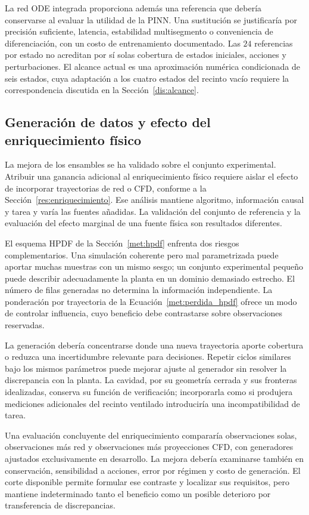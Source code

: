La red ODE integrada proporciona además una referencia que debería conservarse al evaluar la utilidad de la PINN. Una sustitución se justificaría por precisión suficiente, latencia, estabilidad multisegmento o conveniencia de diferenciación, con un costo de entrenamiento documentado. Las $24$ referencias por estado no acreditan por sí solas cobertura de estados iniciales, acciones y perturbaciones. El alcance actual es una aproximación numérica condicionada de seis estados, cuya adaptación a los cuatro estados del recinto vacío requiere la correspondencia discutida en la Sección~\ref{dis:alcance}.

\subsection{Generación de datos y efecto del enriquecimiento físico}

La mejora de los ensambles se ha validado sobre el conjunto experimental. Atribuir una ganancia adicional al enriquecimiento físico requiere aislar el efecto de incorporar trayectorias de red o CFD, conforme a la Sección~\ref{res:enriquecimiento}. Ese análisis mantiene algoritmo, información causal y tarea y varía las fuentes añadidas. La validación del conjunto de referencia y la evaluación del efecto marginal de una fuente física son resultados diferentes.

El esquema HPDF de la Sección~\ref{met:hpdf} enfrenta dos riesgos complementarios. Una simulación coherente pero mal parametrizada puede aportar muchas muestras con un mismo sesgo; un conjunto experimental pequeño puede describir adecuadamente la planta en un dominio demasiado estrecho. El número de filas generadas no determina la información independiente. La ponderación por trayectoria de la Ecuación~\eqref{met:perdida_hpdf} ofrece un modo de controlar influencia, cuyo beneficio debe contrastarse sobre observaciones reservadas.

La generación debería concentrarse donde una nueva trayectoria aporte cobertura o reduzca una incertidumbre relevante para decisiones. Repetir ciclos similares bajo los mismos parámetros puede mejorar ajuste al generador sin resolver la discrepancia con la planta. La cavidad, por su geometría cerrada y sus fronteras idealizadas, conserva su función de verificación; incorporarla como si produjera mediciones adicionales del recinto ventilado introduciría una incompatibilidad de tarea.

Una evaluación concluyente del enriquecimiento compararía observaciones solas, observaciones más red y observaciones más proyecciones CFD, con generadores ajustados exclusivamente en desarrollo. La mejora debería examinarse también en conservación, sensibilidad a acciones, error por régimen y costo de generación. El corte disponible permite formular ese contraste y localizar sus requisitos, pero mantiene indeterminado tanto el beneficio como un posible deterioro por transferencia de discrepancias.
\FloatBarrier

